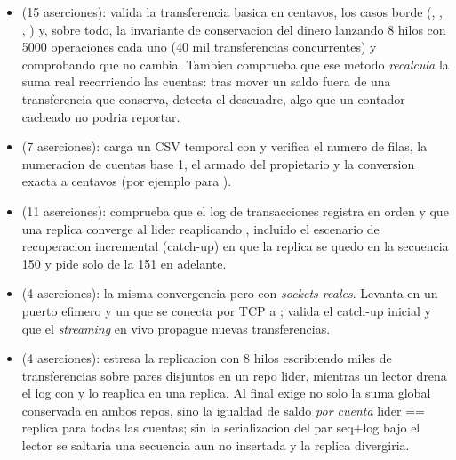 \begin{itemize}
\item {} (15 aserciones): valida la
transferencia basica en centavos, los casos borde (,
, , )
y, sobre todo, la invariante de conservacion del dinero lanzando 8 hilos con
5000 operaciones cada uno (40 mil transferencias concurrentes) y comprobando que
 no cambia. Tambien comprueba que ese metodo
\emph{recalcula} la suma real recorriendo las cuentas: tras mover un saldo fuera
de una transferencia que conserva,  detecta el
descuadre, algo que un contador cacheado no podria reportar.

\item {} (7 aserciones): carga un CSV
temporal con  y verifica el numero de filas, la
numeracion de cuentas base 1, el armado del propietario y la conversion exacta a
centavos (por ejemplo  para ).

\item {} (11 aserciones): comprueba que el
log de transacciones registra en orden y que una replica converge al lider
reaplicando , incluido el escenario de recuperacion
incremental (catch-up) en que la replica se quedo en la secuencia 150 y pide
solo de la 151 en adelante.

\item {} (4 aserciones): la misma
convergencia pero con \emph{sockets reales}. Levanta 
en un puerto efimero y un  que se conecta por TCP a
; valida el catch-up inicial y que el \emph{streaming} en vivo
propague nuevas transferencias.

\item {} (4 aserciones): estresa la
replicacion con 8 hilos escribiendo miles de transferencias sobre pares
disjuntos en un repo lider, mientras un lector drena el log con
 y lo reaplica en una replica. Al final exige
no solo la suma global conservada en ambos repos, sino la igualdad de saldo
\emph{por cuenta} lider == replica para todas las cuentas; sin la serializacion
del par seq+log bajo  el lector se saltaria una secuencia aun no
insertada y la replica divergiria.


\end{itemize}

